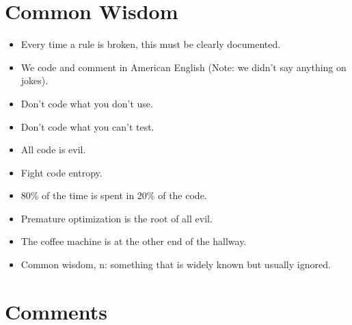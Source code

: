 \documentclass[10pt,a4paper,titlepage,dutch]{report}
\begin{document}

\chapter{Common Wisdom}

\begin{itemize}
    \item Every time a rule is broken, this must be clearly documented.
    \item We code and comment in American English (Note: we didn't say
anything on jokes).
    \item Don't code what you don't use.
    \item Don't code what you can't test.
    \item All code is evil.
    \item Fight code entropy.
    \item 80\% of the time is spent in 20\% of the code.
    \item Premature optimization is the root of all evil.
    \item The coffee machine is at the other end of the hallway.
    \item Common wisdom, n: something that is widely known but usually
ignored.
\end{itemize}


\chapter{Comments}
\end{document}

